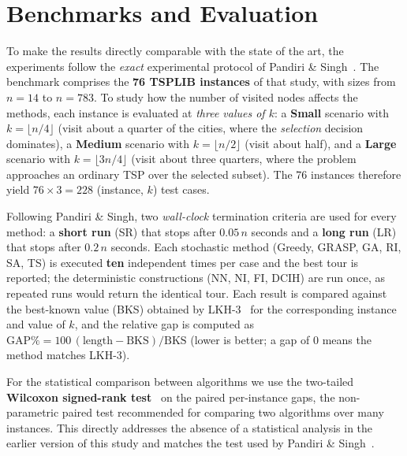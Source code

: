 \documentclass[12pt,a4paper,oneside]{report}
\begin{document}
\section{Benchmarks and Evaluation}
To make the results directly comparable with the state of the art, the experiments
follow the \emph{exact} experimental protocol of Pandiri \&
Singh~\cite{pandiri2020}. The benchmark comprises the \textbf{76 TSPLIB instances}
of that study, with sizes from $n=14$ to $n=783$. To study how the number of
visited nodes affects the methods, each instance is evaluated at \emph{three values
of $k$}: a \textbf{Small} scenario with $k=\lfloor n/4\rfloor$ (visit about a
quarter of the cities, where the \emph{selection} decision dominates), a
\textbf{Medium} scenario with $k=\lfloor n/2\rfloor$ (visit about half), and a
\textbf{Large} scenario with $k=\lfloor 3n/4\rfloor$ (visit about three quarters,
where the problem approaches an ordinary TSP over the selected subset). The 76
instances therefore yield $76\times 3 = 228$ (instance, $k$) test cases.

Following Pandiri \& Singh, two \emph{wall-clock} termination criteria are used for
every method: a \textbf{short run} (SR) that stops after $0.05\,n$ seconds and a
\textbf{long run} (LR) that stops after $0.2\,n$ seconds. Each stochastic method
(Greedy, GRASP, GA, RI, SA, TS) is executed \textbf{ten} independent times per case
and the best tour is reported; the deterministic constructions (NN, NI, FI, DCIH)
are run once, as repeated runs would return the identical tour. Each result is
compared against the best-known value (BKS) obtained by LKH-3~\cite{Helsgaun} for
the corresponding instance and value of $k$, and the relative gap is computed as
$\mathrm{GAP}\%=100\,(\text{length}-\text{BKS})/\text{BKS}$ (lower is better; a gap
of $0$ means the method matches LKH-3).

For the statistical comparison between algorithms we use the two-tailed
\textbf{Wilcoxon signed-rank test}~\cite{knox1994} on the paired per-instance gaps,
the non-parametric paired test recommended for comparing two algorithms over many
instances. This directly addresses the absence of a statistical analysis in the
earlier version of this study and matches the test used by Pandiri \&
Singh~\cite{pandiri2020}.
\end{document}
